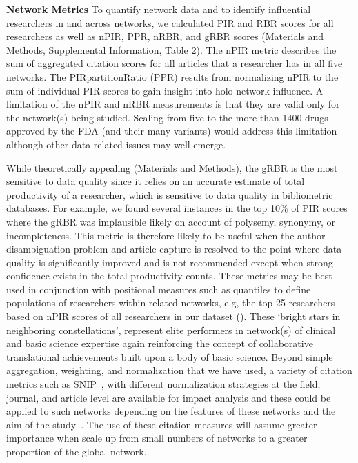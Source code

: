 \documentclass[10pt,letterpaper]{article}
\begin{document}
\textbf{Network Metrics} To quantify network data and to identify influential researchers in and across networks, we calculated PIR and RBR scores for all researchers as well as nPIR, PPR, nRBR, and gRBR scores (Materials and Methods, Supplemental Information, Table 2). The nPIR metric describes the sum of aggregated citation scores for all articles that a researcher has in all five networks. The PIRpartitionRatio (PPR) results from normalizing nPIR to the sum of individual PIR scores to gain insight into holo-network influence. A limitation of the nPIR and nRBR measurements is that they are valid only for the network(s) being studied. Scaling from five to the more than 1400 drugs approved by the FDA (and their many variants) would address this limitation~\cite{bibKinch} although other data related issues may well emerge. 

While theoretically appealing (Materials and Methods), the gRBR is the most sensitive to data quality since it relies on an accurate estimate of total productivity of a researcher, which is sensitive to data quality in bibliometric databases. For example, we found several instances in the top 10\% of PIR scores where the gRBR was implausible likely on account of polysemy, synonymy, or incompleteness. This metric is therefore likely to be useful when the author disambiguation problem and article capture is resolved to the point where data quality is significantly improved and is not recommended except when strong confidence exists in the total productivity counts. These metrics may be best used in conjunction with positional measures such as quantiles to define populations of researchers within related networks, e.g, the top 25 researchers based on nPIR scores of all researchers in our dataset (). These `bright stars in neighboring constellations', represent elite performers in network(s) of clinical and basic science expertise again reinforcing the concept of collaborative translational achievements built upon a body of basic science. Beyond simple aggregation, weighting, and normalization that we have used, a variety of citation metrics such as SNIP~\cite{bibWaltman}, with different normalization strategies at the field, journal, and article level are available for impact analysis and these could be applied to such networks depending on the features of these networks and the aim of the study~\cite{bibIoannidis}. The use of these citation measures will assume greater importance when scale up from small numbers of networks to a greater proportion of the global network.
\end{document}
